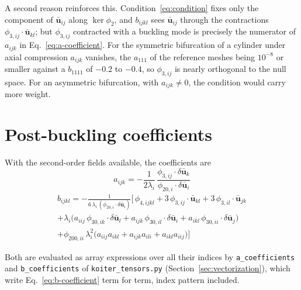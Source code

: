 \documentclass[11pt,a4paper]{article}
\begin{document}
A second reason reinforces this.  Condition~\ref{eq:condition} fixes only the
component of $\boldsymbol{\bar{u}}_{ij}$ along $\ker\phi_2$, and $b_{ijkl}$
sees $\boldsymbol{\bar{u}}_{ij}$ through the contractions
$\phi_{3,ij}\cdot\boldsymbol{\bar{u}}_{kl}$; but $\phi_{3,ij}$ contracted with
a buckling mode is precisely the numerator of $a_{ijk}$ in
Eq.~\ref{eq:a-coefficient}.  For the symmetric bifurcation of a cylinder under
axial compression $a_{ijk}$ vanishes, the $a_{111}$ of the reference meshes
being $10^{-8}$ or smaller against a $b_{1111}$ of $-0.2$ to $-0.4$, so
$\phi_{3,ij}$ is nearly orthogonal to the null space.  For an asymmetric
bifurcation, with $a_{ijk}\neq0$, the condition would carry more weight.

\section{Post-buckling coefficients}

With the second-order fields available, the coefficients are
\begin{equation}\label{eq:a-coefficient}
	a_{ijk} = -\frac{1}{2\lambda_i}\,
	  \frac{\phi_{3,ij}\cdot\delta\boldsymbol{\bar{u}}_k}
	       {\phi_{20,i}\cdot\delta\boldsymbol{\bar{u}}_i}
\end{equation}
\begin{multline}\label{eq:b-coefficient}
	b_{ijkl} = -\frac{1}
	  {6\,\lambda_i\,(\phi_{20,i}\cdot\delta\boldsymbol{\bar{u}}_i)}
	\Big[\,
	  \phi_{4,ijkl}
	  + 3\,\phi_{3,ij}\cdot\boldsymbol{\bar{u}}_{kl}
	  + 3\,\phi_{3,il}\cdot\boldsymbol{\bar{u}}_{jk} \\
	  + \lambda_i\big(
	      a_{iij}\,\phi_{30,ik}\!\cdot\!\delta\boldsymbol{\bar{u}}_l
	    + a_{ijk}\,\phi_{30,il}\!\cdot\!\delta\boldsymbol{\bar{u}}_i
	    + a_{ikl}\,\phi_{30,ii}\!\cdot\!\delta\boldsymbol{\bar{u}}_j \big) \\
	  + \phi_{200,ii}\,\lambda_i^2\big(
	      a_{iij}a_{ikl} + a_{ijk}a_{ili} + a_{ikl}a_{iij} \big)
	\Big]
\end{multline}

Both are evaluated as array expressions over all their indices by
\texttt{a\_coefficients} and \texttt{b\_coefficients} of
\texttt{koiter\_tensors.py} (Section~\ref{sec:vectorization}), which write
Eq.~\ref{eq:b-coefficient} term for term, index pattern included.
\end{document}
